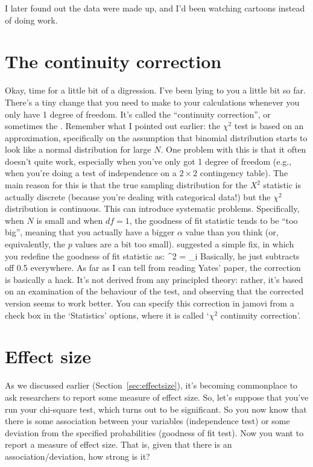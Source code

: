 
I later found out the data were made up, and I'd been watching cartoons instead of doing work.
\vspace*{12pt}


\section{The continuity correction~\label{sec:yates}}

Okay, time for a little bit of a digression. I've been lying to you a little bit so far. There's a tiny change that you need to make to your calculations whenever you only have 1 degree of freedom. It's called the ``continuity correction'', or sometimes the . Remember what I pointed out earlier: the $\chi^2$ test is based on an approximation, specifically on the assumption that binomial distribution starts to look like a normal distribution for large $N$. One problem with this is that it often doesn't quite work, especially when you've only got 1 degree of freedom (e.g., when you're doing a test of independence on a $2 \times 2$ contingency table). The main reason for this is that the true sampling distribution for the $X^2$ statistic is actually discrete (because you're dealing with categorical data!) but the $\chi^2$ distribution is continuous. This can introduce systematic problems. Specifically, when $N$ is small and when $df=1$, the goodness of fit statistic tends to be ``too big'', meaning that you actually have a bigger $\alpha$ value than you think (or, equivalently, the $p$ values are a bit too small).  suggested a simple fix, in which you redefine the goodness of fit statistic as:
\be
\chi^2 = \sum_{i} 
\ee
Basically, he just subtracts off 0.5 everywhere. As far as I can tell from reading Yates' paper, the correction is basically a hack. It's not derived from any principled theory: rather, it's based on an examination of the behaviour of the test, and observing that the corrected version seems to work better. You can specify this correction in jamovi from a check box in the `Statistics' options, where it is called `$\chi^2$ continuity correction'. 


\section{Effect size~\label{sec:chisqeffectsize}}

As we discussed earlier (Section~\ref{sec:effectsize}), it's becoming commonplace to ask researchers to report some measure of effect size. So, let's suppose that you've run your chi-square test, which turns out to be significant. So you now know that there is some association between your variables (independence test) or some deviation from the specified probabilities (goodness of fit test). Now you want to report a measure of effect size. That is, given that there is an association/deviation, how strong is it?


